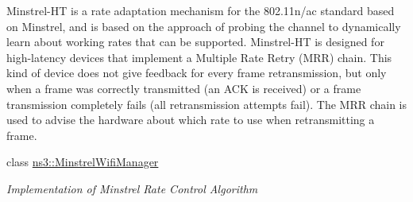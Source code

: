 \begin{DoxyCompactItemize}
\begin{DoxyCompactList}
Minstrel-\/\+HT is a rate adaptation mechanism for the 802.\+11n/ac standard based on Minstrel, and is based on the approach of probing the channel to dynamically learn about working rates that can be supported. Minstrel-\/\+HT is designed for high-\/latency devices that implement a Multiple Rate Retry (M\+RR) chain. This kind of device does not give feedback for every frame retransmission, but only when a frame was correctly transmitted (an A\+CK is received) or a frame transmission completely fails (all retransmission attempts fail). The M\+RR chain is used to advise the hardware about which rate to use when retransmitting a frame. \end{DoxyCompactList}\item 
class \hyperlink{classns3_1_1MinstrelWifiManager}{ns3\+::\+Minstrel\+Wifi\+Manager}
\begin{DoxyCompactList}\small\item\em Implementation of Minstrel Rate Control Algorithm


\end{DoxyCompactList}
\end{DoxyCompactItemize}
